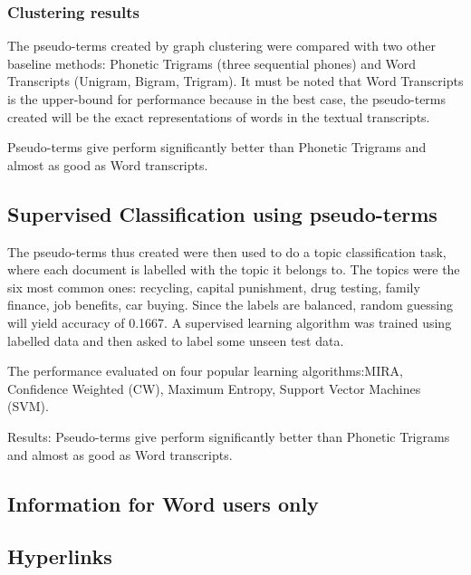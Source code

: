 \documentclass[a4paper]{article}
\begin{document}
\subsubsection{Clustering results}
The pseudo-terms created by graph clustering were compared with two other baseline methods: Phonetic Trigrams (three sequential phones) and Word Transcripts (Unigram, Bigram, Trigram). It must be noted that Word Transcripts is the upper-bound for performance because in the best case, the pseudo-terms created will be the exact representations of words in the textual transcripts.

Pseudo-terms give perform significantly better than Phonetic Trigrams and almost as good as Word transcripts.


\subsection{Supervised Classification using pseudo-terms}
The pseudo-terms thus created were then used to do a topic classification task, where each document is labelled with the topic it belongs to. The topics were the six most common ones: recycling, capital punishment, drug testing, family finance, job benefits, car buying. Since the labels are balanced, random guessing will yield accuracy of 0.1667. A supervised learning algorithm was trained using labelled data and then asked to label some unseen test data.

The performance evaluated on four popular learning algorithms:MIRA, Confidence Weighted (CW), Maximum Entropy, Support Vector Machines (SVM).

Results:
Pseudo-terms give perform significantly better than Phonetic Trigrams and almost as good as Word transcripts.



\subsection{Information for Word users only}


\subsection{Hyperlinks}
\end{document}

